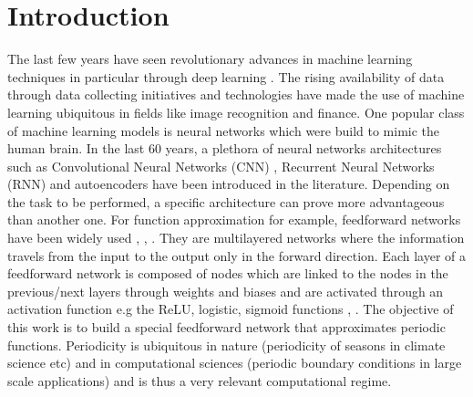 \documentclass[AMS,STIX1COL]{WileyNJD-v2}
\begin{document}
\maketitle



\section{Introduction}

The last few years have seen revolutionary advances in machine learning techniques in particular through deep learning \cite{Geron2017}. The rising availability of data through data collecting initiatives and technologies have made the use of machine learning ubiquitous in fields like image recognition and finance. One popular class of machine learning models is neural networks which were build to mimic the human brain. In the last 60 years, a plethora of neural networks architectures such as Convolutional Neural Networks (CNN) \cite{LeCun1999}, Recurrent Neural Networks (RNN) \cite{Hochreiter1997} and autoencoders \cite{Rumelhart1986} have been introduced in the literature. Depending on the task to be performed, a specific architecture can prove more advantageous than another one. For function approximation for example, feedforward networks have been widely used \cite{Barron1993}, \cite{Cybenko1992}, \cite{HORNIK1989}. They are multilayered networks where the information travels from the input to the output only in the forward direction. Each layer of a feedforward network is composed of nodes which are linked to the nodes in the previous/next layers through weights and biases and are activated through an activation function e.g  the ReLU, logistic, sigmoid functions \cite{Nwankpa2018}, \cite{Glorot2010}. The objective of this work is to build a special feedforward network that approximates periodic functions. Periodicity is ubiquitous in nature (periodicity of seasons in climate science etc) and in computational sciences (periodic boundary conditions in large scale applications) and is thus a very relevant computational regime.\\
\end{document}
